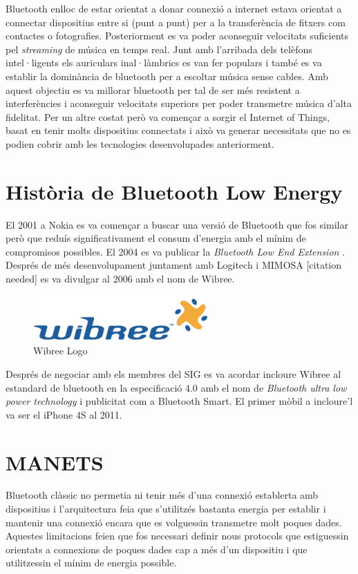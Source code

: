 Bluetooth enlloc de estar orientat a donar connexió a internet estava orientat a connectar dispositius entre si (punt a punt) per a la transferència de fitxers com contactes o fotografies.
Posteriorment es va poder aconseguir velocitats suficients pel \textit{streaming} de música en temps real.
Junt amb l'arribada dels telèfons intel·ligents els auriculars inal·làmbrics es van fer populars i també es va establir la dominància de bluetooth per a escoltar música sense cables.
Amb aquest objectiu es va millorar bluetooth per tal de ser més resistent a interferències i aconseguir velocitats superiors per poder transmetre música d'alta fidelitat.
Per un altre costat però va començar a sorgir el Internet of Things, basat en tenir molts dispositius connectats i això va generar necessitats que no es podien cobrir amb les tecnologies desenvolupades anteriorment.


\section{Història de Bluetooth Low Energy}
El 2001 a Nokia es va començar a buscar una versió de Bluetooth que fos similar però que reduís significativament el consum d'energia amb el mínim de compromisos possibles.
El 2004 es va publicar la \textit{Bluetooth Low End Extension} \cite{Original_BLE_Extension}. 
Després de més desenvolupament juntament amb Logitech i MIMOSA [citation needed] es va divulgar al 2006 amb el nom de Wibree.

\begin{figure}[h]
	\begin{center}
		\includegraphics[width=0.6\textwidth]{./images/Wibree_Logo.png}
		\caption{Wibree Logo}
	\end{center}
\end{figure}

Després de negociar amb els membres del SIG es va acordar incloure Wibree al estandard de bluetooth en la especificació 4.0 amb el nom de \textit{Bluetooth ultra low power technology} i publicitat com a Bluetooth Smart. El primer mòbil a incloure'l va ser el iPhone 4S al 2011.


\section{MANETS}
Bluetooth clàssic no permetia ni tenir més d'una connexió establerta amb dispositius i l'arquitectura feia que s'utilitzés bastanta energia per establir i mantenir una connexió encara que es volguessin transmetre molt poques dades.
Aquestes limitacions feien que fos necessari definir nous protocols que estiguessin orientats a connexions de poques dades cap a més d'un dispositiu i que utilitzessin el mínim de energia possible.

